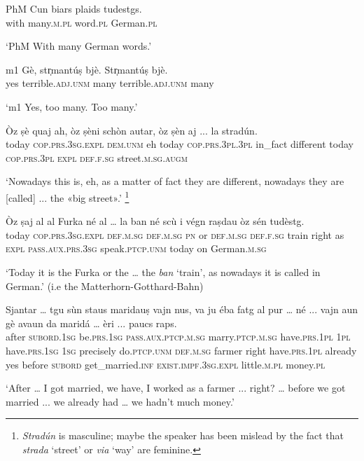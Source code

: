 \begin{linenumbers}
\gll    {\ob}PhM{\cb} Cun biars plaids tudestgs.\\
\text{}	 with  many.\textsc{m.pl} word.\textsc{pl} German.\textsc{pl} \\
\end{linenumbers}
\medskip
\glt `{\ob}PhM{\cb} With many German words.'
\medskip

\begin{linenumbers}
\gll   {\ob}m1{\cb} Gè, str̩mantúṣ bjè. Str̩mantúṣ bjè.\\
\textsc{}	yes terrible.\textsc{adj.unm} many terrible.\textsc{adj.unm} many\\
\end{linenumbers}
\medskip
\glt `{\ob}m1{\cb} Yes, too many. Too many.'
\medskip 

\begin{linenumbers}
\gll    Òz ṣè quaj ah, òz ṣèni schòn autar, òz ṣèn aj ... la stradún. \\
today \textsc{cop.prs.3sg.expl} \textsc{dem.unm} eh today \textsc{cop.prs.3pl.3pl} in\_fact different today \textsc{cop.prs.3pl} \textsc{expl} \textsc{} \textsc{def.f.sg} street.\textsc{m.sg.augm} \\
\end{linenumbers}
\medskip
\glt `Nowadays this is, eh, as a matter of fact they are different, nowadays they are [called] ... the «big street».' \footnote{\textit{Stradún} is masculine; maybe the speaker has been mislead by the fact that \textit{strada} `street' or \textit{via} `way' are feminine.}
\medskip

\begin{linenumbers}
\gll    Òz ṣaj al al Furka né al … la ban\footnotemark{} né scù i végn raṣdau òz sén tudèstg.\\
today \textsc{cop.prs.3sg.expl} \textsc{def.m.sg} \textsc{def.m.sg} \textsc{pn} or \textsc{def.m.sg} {} \textsc{def.f.sg} train right as \textsc{expl} \textsc{pass.aux.prs.3sg} speak.\textsc{ptcp.unm} today on German.\textsc{m.sg}\\
\end{linenumbers}
\medskip
\glt `Today it is the Furka or the … the \textit{ban} `train', as nowadays it is called in German.' (i.e the Matterhorn-Gotthard-Bahn)
\medskip

\begin{linenumbers}
\gll    Sjantar … tgu sùn staus maridauṣ vajn nus, va ju éba fatg al pur … né ... vajn aun gè avaun da maridá … èri ... paucs raps.\\
after {} \textsc{subord.1sg} be.\textsc{prs.1sg} \textsc{pass.aux.ptcp.m.sg} marry.\textsc{ptcp.m.sg} have.\textsc{prs.1pl} \textsc{1pl} have.\textsc{prs.1sg} \textsc{1sg} precisely do.\textsc{ptcp.unm} \textsc{def.m.sg} farmer {} right {} have.\textsc{prs.1pl} already yes before \textsc{subord} get\_married.\textsc{inf} {} \textsc{exist.impf.3sg.expl} {} little.\textsc{m.pl} money.\textsc{pl}\\
\end{linenumbers}
\medskip
\glt `After … I got married, we have, I worked as a farmer ... right? … before we got married ... we already had  … we hadn’t much money.'
\medskip


